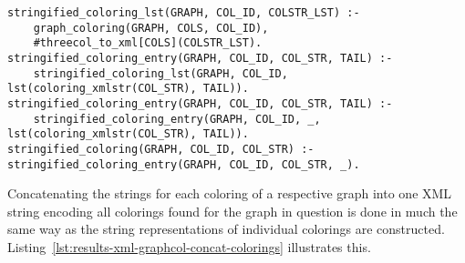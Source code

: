 \begin{lstlisting}[style=asp-code, label={lst:results-xml-graphcol-stringify}, caption={Generating XML strings for graph colorings.}]
% Translate colorings into strings
stringified_coloring_lst(GRAPH, COL_ID, COLSTR_LST) :- 
    graph_coloring(GRAPH, COLS, COL_ID),
    #threecol_to_xml[COLS](COLSTR_LST).
stringified_coloring_entry(GRAPH, COL_ID, COL_STR, TAIL) :-
    stringified_coloring_lst(GRAPH, COL_ID, lst(coloring_xmlstr(COL_STR), TAIL)).
stringified_coloring_entry(GRAPH, COL_ID, COL_STR, TAIL) :-
    stringified_coloring_entry(GRAPH, COL_ID, _, lst(coloring_xmlstr(COL_STR), TAIL)).	
stringified_coloring(GRAPH, COL_ID, COL_STR) :- stringified_coloring_entry(GRAPH, COL_ID, COL_STR, _).
\end{lstlisting}  

Concatenating the strings for each coloring of a respective graph into one XML string encoding all colorings found for the graph in question is done in much the same way as the string representations of individual colorings are constructed. Listing~\ref{lst:results-xml-graphcol-concat-colorings} illustrates this.

